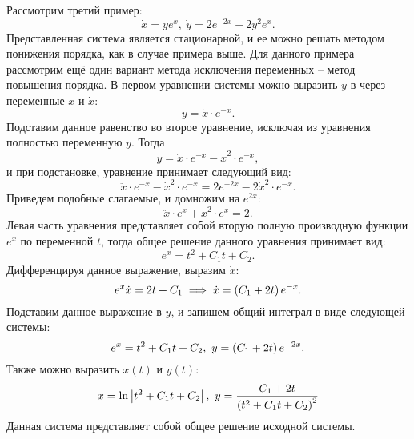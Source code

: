 		Рассмотрим третий пример:
		\[ \dot{x} = y e^{x}, ~ \dot{y} = 2e^{-2x} - 2y^2 e^{x}. \]
		Представленная система является стационарной, и ее можно решать методом понижения порядка, как в случае примера выше. Для данного примера рассмотрим ещё один вариант метода исключения переменных -- метод повышения порядка. В первом уравнении системы можно выразить $y$ в через переменные $x$ и $\dot{x}$:
		\[ y = \dot{x} \cdot e^{-x}. \]
		Подставим данное равенство во второе уравнение, исключая из уравнения полностью переменную $y$. Тогда
		\[ \dot{y} = \ddot{x} \cdot e^{-x} - \dot{x}^2 \cdot e^{-x}, \]
		и при подстановке, уравнение принимает следующий вид:
		\[ \ddot{x} \cdot e^{-x} - \dot{x}^2 \cdot e^{-x} = 2e^{-2x} -2 \dot{x}^2 \cdot e^{-x}. \]
		Приведем подобные слагаемые, и домножим на $e^{2x}$:
		\[ \ddot{x} \cdot e^{x} + \dot{x}^2 \cdot e^{x} = 2. \]
		Левая часть уравнения представляет собой вторую полную производную функции $e^x$ по переменной $t$, тогда общее решение данного уравнения принимает вид:
		\[ e^{x} = t^2 + C_1 t + C_2. \]
		Дифференцируя данное выражение, выразим $\dot{x}$:
		\[ e^{x} \dot{x} = 2t + C_1 \implies \dot{x} = \left( C_1 + 2t \right) e^{-x}. \]
		Подставим данное выражение в $y$, и запишем общий интеграл в виде следующей системы:
		\[ e^{x} = t^2 + C_1 t + C_2, ~ y = \left( C_1 + 2t \right) e^{-2x}. \]
		Также можно выразить $x(t)$ и $y(t)$:
		\[ x = \ln\left\vert t^2 + C_1 t + C_2 \right\vert, ~ y = \frac{C_1 + 2t}{\left( t^2 + C_1 t + C_2 \right)^2} \]
		Данная система представляет собой общее решение исходной системы.

		\vspace{10pt}

